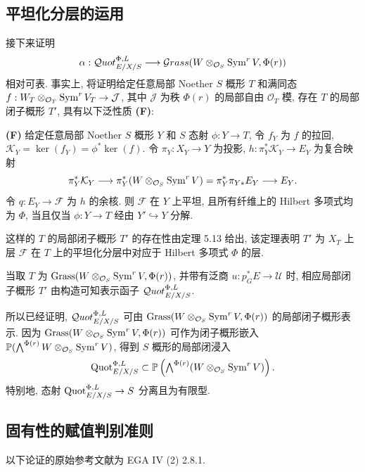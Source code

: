 \subsection{平坦化分层的运用}\label{ch05:sec5.5.6}
接下来证明
\[
 \alpha:\mathcal{Q}uot^{\Phi,L}_{E/X/S}\longrightarrow\mathcal{G}rass(W\otimes_{\mathcal O_S}\operatorname{Sym}^rV,\Phi(r))
\]
相对可表. 事实上, 将证明给定任意局部 Noether $S$ 概形 $T$ 和满同态 $f:W_T\otimes_{\mathcal O_T}\operatorname{Sym}^rV_T\to\mathcal J$, 其中 $\mathcal J$ 为秩 $\Phi(r)$ 的局部自由 $\mathcal O_T$ 模, 存在 $T$ 的局部闭子概形 $T'$, 具有以下泛性质 \textbf{(F)}:

\textbf{(F)} 给定任意局部 Noether $S$ 概形 $Y$ 和 $S$ 态射 $\phi:Y\to T$, 令 $f_Y$ 为 $f$ 的拉回, $\mathcal K_Y=\ker(f_Y)=\phi^*\ker(f)$. 令 $\pi_Y:X_Y\to Y$ 为投影, $h:\pi_Y^*\mathcal K_Y\to E_Y$ 为复合映射
\[
 \pi_Y^*\mathcal K_Y\longrightarrow\pi_Y^*(W\otimes_{\mathcal O_S}\operatorname{Sym}^rV)
 =\pi_Y^*\pi_{Y*}E_Y\longrightarrow E_Y.
\]
令 $q:E_Y\to\mathcal F$ 为 $h$ 的余核. 则 $\mathcal F$ 在 $Y$ 上平坦, 且所有纤维上的 Hilbert 多项式均为 $\Phi$, 当且仅当 $\phi:Y\to T$ 经由 $Y'\hookrightarrow Y$ 分解.

这样的 $T$ 的局部闭子概形 $T'$ 的存在性由定理 5.13 给出, 该定理表明 $T'$ 为 $X_T$ 上层 $\mathcal F$ 在 $T$ 上的平坦化分层中对应于 Hilbert 多项式 $\Phi$ 的层.

当取 $T$ 为 $\operatorname{Grass}(W\otimes_{\mathcal O_S}\operatorname{Sym}^rV,\Phi(r))$, 并带有泛商 $u:p_G^*E\to\mathcal U$ 时, 相应局部闭子概形 $T'$ 由构造可知表示函子 $\mathcal{Q}uot^{\Phi,L}_{E/X/S}$.

所以已经证明, $\mathcal{Q}uot^{\Phi,L}_{E/X/S}$ 可由 $\operatorname{Grass}(W\otimes_{\mathcal O_S}\operatorname{Sym}^rV,\Phi(r))$ 的局部闭子概形表示. 因为 $\operatorname{Grass}(W\otimes_{\mathcal O_S}\operatorname{Sym}^rV,\Phi(r))$ 可作为闭子概形嵌入 $\mathbb P(\bigwedge^{\Phi(r)}W\otimes_{\mathcal O_S}\operatorname{Sym}^rV)$, 得到 $S$ 概形的局部闭浸入
\[
 \operatorname{Quot}^{\Phi,L}_{E/X/S}\subset
 \mathbb P\left(\textstyle\bigwedge^{\Phi(r)}(W\otimes_{\mathcal O_S}\operatorname{Sym}^rV)\right).
\]
特别地, 态射 $\operatorname{Quot}^{\Phi,L}_{E/X/S}\to S$ 分离且为有限型.

\subsection{固有性的赋值判别准则}\label{ch05:sec5.5.7}
以下论证的原始参考文献为 EGA IV (2) 2.8.1.

